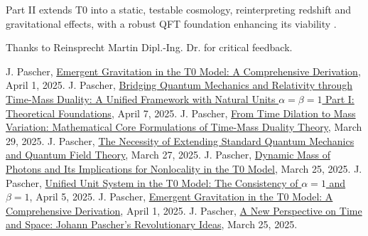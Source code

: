 \documentclass[twocolumn,aps,prl]{revtex4-2}
\begin{document}
	Part II extends T0 into a static, testable cosmology, reinterpreting redshift and gravitational effects, with a robust QFT foundation enhancing its viability \cite{pascher_perspective_2025}.
	
	\begin{acknowledgments}
		Thanks to Reinsprecht Martin Dipl.-Ing. Dr. for critical feedback.
	\end{acknowledgments}
		
	\begin{thebibliography}{99}
		 J. Pascher, \href{https://github.com/jpascher/T0-Time-Mass-Duality/tree/main/2/pdf/English/EmergentGravT0En.pdf}{Emergent Gravitation in the T0 Model: A Comprehensive Derivation}, April 1, 2025.
		 J. Pascher, \href{https://github.com/jpascher/T0-Time-Mass-Duality/tree/main/2/pdf/English/QMRelTimeMassPart1En.pdf}{Bridging Quantum Mechanics and Relativity through Time-Mass Duality: A Unified Framework with Natural Units \(\alpha = \beta = 1\) Part I: Theoretical Foundations}, April 7, 2025.
		 J. Pascher, \href{https://github.com/jpascher/T0-Time-Mass-Duality/tree/main/2/pdf/English/MathZeitMasseLagrange.pdf}{From Time Dilation to Mass Variation: Mathematical Core Formulations of Time-Mass Duality Theory}, March 29, 2025.
		 J. Pascher, \href{https://github.com/jpascher/T0-Time-Mass-Duality/tree/main/2/pdf/English/NotwendigkeitQMErweiterungEn.pdf}{The Necessity of Extending Standard Quantum Mechanics and Quantum Field Theory}, March 27, 2025.
		 J. Pascher, \href{https://github.com/jpascher/T0-Time-Mass-Duality/tree/main/2/pdf/English/DynMassePhotonenNichtlokalEn.pdf}{Dynamic Mass of Photons and Its Implications for Nonlocality in the T0 Model}, March 25, 2025.
		 J. Pascher, \href{https://github.com/jpascher/T0-Time-Mass-Duality/tree/main/2/pdf/English/Alpha1Beta1KonsistenzEn.pdf}{Unified Unit System in the T0 Model: The Consistency of \(\alpha = 1\) and \(\beta = 1\)}, April 5, 2025.
		 J. Pascher, \href{https://github.com/jpascher/T0-Time-Mass-Duality/tree/main/2/pdf/English/EmergentGravT0En.pdf}{Emergent Gravitation in the T0 Model: A Comprehensive Derivation}, April 1, 2025.
		 J. Pascher, \href{https://github.com/jpascher/T0-Time-Mass-Duality/tree/main/2/pdf/English/ZeitRaumPascherEn.pdf}{A New Perspective on Time and Space: Johann Pascher’s Revolutionary Ideas}, March 25, 2025.

\end{thebibliography}
\end{document}
